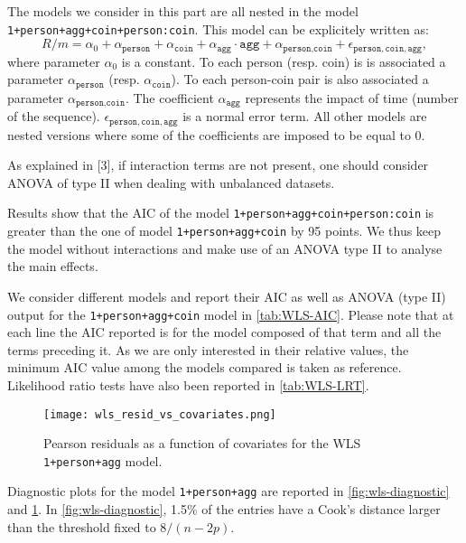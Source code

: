\documentclass[a4paper, 12pt,oneside]{article}
\begin{document}
			The models we consider in this part are all nested in the model \texttt{1+person+agg+coin+person:coin}.
			This model can be explicitely written as: 
			\begin{equation}
				\label{eq:wls_model}
				R/m = \alpha_0 + \alpha_{\texttt{person}}+\alpha_{\texttt{coin}} +\alpha_{\texttt{agg}}\cdot\texttt{agg} +\alpha_{\texttt{person},\texttt{coin}} + \epsilon_{\texttt{person},\texttt{coin},\texttt{agg}},
			\end{equation}
			where parameter $\alpha_0$ is a constant. To each person (resp. coin) is is associated a parameter
			$\alpha_{\texttt{person}}$ (resp. $\alpha_{\texttt{coin}}$). To each person-coin pair is also associated a parameter $\alpha_{\texttt{person},\texttt{coin}}$. The coefficient $\alpha_{\texttt{agg}}$ represents the impact of time (number of the sequence). $\epsilon_{\texttt{person},\texttt{coin},\texttt{agg}}$ is a normal error term. All other models are nested versions where some of the coefficients are imposed to be equal to 0.

			
			As explained in [3], if interaction terms are not present, one should consider ANOVA of type II when dealing with unbalanced datasets.

			Results show that the AIC of the model \texttt{1+person+agg+coin+person:coin} is greater than the one of model \texttt{1+person+agg+coin} by 95 points. We thus keep the model without interactions and make use of an ANOVA type II to analyse the main effects. 

			We consider different models and report their AIC as well as  ANOVA (type II) output for the \texttt{1+person+agg+coin} model in \ref{tab:WLS-AIC}. Please note that at each line the AIC reported is for the model composed of that term and all the terms preceding it. As we are only interested in their relative values, the minimum AIC value among the models compared is taken as reference. 
			Likelihood ratio tests have also been reported in \ref{tab:WLS-LRT}.
			\begin{figure}[htb]
				\vspace{-1em}
				\centering
				\texttt{[image: wls\_resid\_vs\_covariates.png]}
				\caption{Pearson residuals as a function of covariates for the WLS \texttt{1+person+agg} model.}
				\label{fig:wls-diagnostic-time-coefs}
			\end{figure}

			Diagnostic plots for the model \texttt{1+person+agg} are reported in \ref{fig:wls-diagnostic} and \ref{fig:wls-diagnostic-time-coefs}. In \ref{fig:wls-diagnostic}, 1.5\% of the entries have a Cook's distance larger than the threshold fixed to $8/(n-2p)$. 
\end{document}
